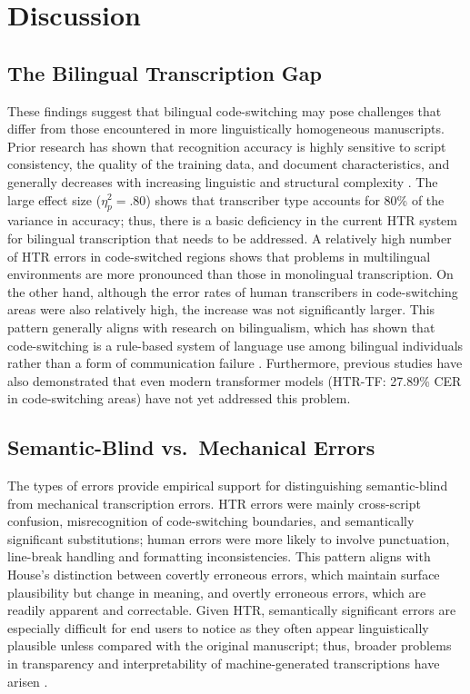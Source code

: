 \documentclass[final]{anthology-ch} %
\begin{document}
\section{Discussion} \label{sec:discussion}

\subsection{The Bilingual Transcription Gap}

These findings suggest that bilingual code-switching may pose challenges that differ from those encountered in more linguistically homogeneous manuscripts. Prior research has shown that recognition accuracy is highly sensitive to script consistency, the quality of the training data, and document characteristics, and generally decreases with increasing linguistic and structural complexity \cite{nockels2022understanding}. The large effect size ($\eta^2_p = .80$) shows that transcriber type accounts for 80\% of the variance in accuracy; thus, there is a basic deficiency in the current HTR system for bilingual transcription that needs to be addressed. A relatively high number of HTR errors in code-switched regions shows that problems in multilingual environments are more pronounced than those in monolingual transcription. On the other hand, although the error rates of human transcribers in code-switching areas were also relatively high, the increase was not significantly larger. This pattern generally aligns with research on bilingualism, which has shown that code-switching is a rule-based system of language use among bilingual individuals rather than a form of communication failure \cite{myersscotton1997duelling}. Furthermore, previous studies have also demonstrated that even modern transformer models (HTR-TF: 27.89\% CER in code-switching areas) have not yet addressed this problem.

\subsection{Semantic-Blind vs.\ Mechanical Errors}

The types of errors provide empirical support for distinguishing semantic-blind from mechanical transcription errors. HTR errors were mainly cross-script confusion, misrecognition of code-switching boundaries, and semantically significant substitutions; human errors were more likely to involve punctuation, line-break handling and formatting inconsistencies. This pattern aligns with House's \cite{house1997translation, house2015translation} distinction between covertly erroneous errors, which maintain surface plausibility but change in meaning, and overtly erroneous errors, which are readily apparent and correctable. Given HTR, semantically significant errors are especially difficult for end users to notice as they often appear linguistically plausible unless compared with the original manuscript; thus, broader problems in transparency and interpretability of machine-generated transcriptions have arisen \cite{nockels2022understanding}.
\end{document}
